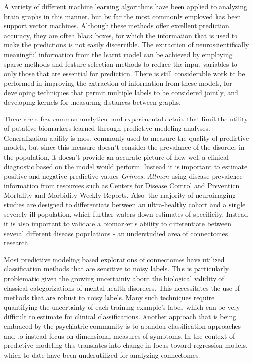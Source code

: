 A variety of different machine learning algorithms have been applied to analyzing brain graphs in this manner, but by far the most commonly employed has been support vector machines\cite{DiMartino}. Although these methods  offer excellent prediction accuracy, they are often black boxes, for which the information that is used to make the predictions is not easily discernible. The extraction of neuroscientifically meaningful information from the learnt model can be achieved by employing sparse methods and feature selection methods to reduce the input variables to only those that are essential for prediction.  There is still considerable work to be performed in improving the extraction of information from these models, for developing techniques that permit multiple labels to be considered jointly, and developing kernels for measuring distances between graphs.

There are a few common analytical and experimental details that limit the utility of putative biomarkers learned through predictive modeling analyses.  Generalization ability is most commonly used to measure the quality of predictive models, but since this measure doesn't consider the prevalance of the disorder in the population, it doesn't provide an accurate picture of how well a clinical diagnostic based on the model would perform. Instead it is important to estimate positive and negative predictive values \emph{Grimes, Altman} using disease prevalence information from resources such as Centers for Disease Control and Prevention Mortality and Morbidity Weekly Reports. Also, the majority of neuroimaging studies are designed to differentiate between an ultra-healthy cohort and a single severely-ill population, which further waters down estimates of specificity. Instead it is also important to validate a biomarker's ability to differentiate between several different disease populations - an understudied area of connectomes research. 

Most predictive modeling based explorations of connectomes have utilized classification methods that are sensitive to noisy labels. This is particularly problematic given the growing uncertainty about the biological validity of classical categorizations of mental health disorders. This necessitates the use of methods that are robust to noisy labels. Many such techniques require quantifying the uncertainty of each training example's label, which can be very difficult to estimate for clinical classifications. Another approach that is being embraced by the psychiatric community is to abandon classification approaches and to instead focus on dimensional measures of symptoms. In the context of predictive modeling this translates into change in focus toward regression models, which to date have been underutilized for analyzing connectomes. 

